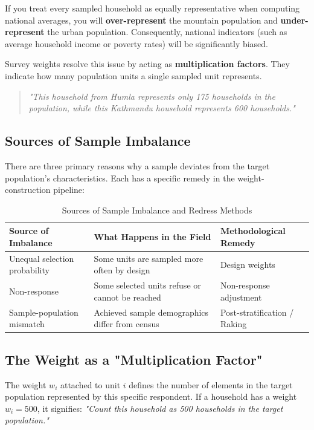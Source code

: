 \documentclass[11pt,a4paper]{article}
\begin{document}
If you treat every sampled household as equally representative when computing national averages, you will \textbf{over-represent} the mountain population and \textbf{under-represent} the urban population. Consequently, national indicators (such as average household income or poverty rates) will be significantly biased.

Survey weights resolve this issue by acting as \textbf{multiplication factors}. They indicate how many population units a single sampled unit represents.
\begin{quote}
  \textit{"This household from Humla represents only 175 households in the population, while this Kathmandu household represents 600 households."}
\end{quote}

\subsection{Sources of Sample Imbalance}
There are three primary reasons why a sample deviates from the target population's characteristics. Each has a specific remedy in the weight-construction pipeline:

\begin{table}[htbp]
  \centering
  \caption{Sources of Sample Imbalance and Redress Methods}
  \label{tab:sources_imbalance}
  \begin{tabularx}{\textwidth}{lXX}
    \toprule
    \textbf{Source of Imbalance} & \textbf{What Happens in the Field} & \textbf{Methodological Remedy} \\
    \midrule
    Unequal selection probability & Some units are sampled more often by design & Design weights \\
    Non-response & Some selected units refuse or cannot be reached & Non-response adjustment \\
    Sample-population mismatch & Achieved sample demographics differ from census & Post-stratification / Raking \\
    \bottomrule
  \end{tabularx}
\end{table}

\subsection{The Weight as a "Multiplication Factor"}
The weight $w_i$ attached to unit $i$ defines the number of elements in the target population represented by this specific respondent. If a household has a weight $w_i = 500$, it signifies: \textit{"Count this household as 500 households in the target population."}
\end{document}
